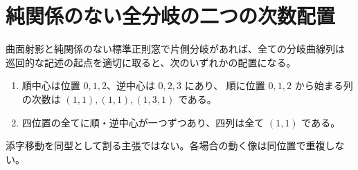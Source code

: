 \section{純関係のない全分岐の二つの次数配置}
\label{sec:pure-branch-degree-patterns}
\begin{theorem}\label{thm:pure-branch-degree-patterns}
曲面射影と純関係のない標準正則窓で片側分岐があれば、全ての分岐曲線列は
巡回的な記述の起点を適切に取ると、次のいずれかの配置になる。
\begin{enumerate}
\item 順中心は位置 $0,1,2$、逆中心は $0,2,3$ にあり、
順に位置 $0,1,2$ から始まる列の次数は $(1,1),(1,1),(1,3,1)$ である。
\item 四位置の全てに順・逆中心が一つずつあり、四列は全て $(1,1)$ である。
\end{enumerate}
添字移動を同型として割る主張ではない。各場合の動く像は同位置で重複しない。
\end{theorem}
